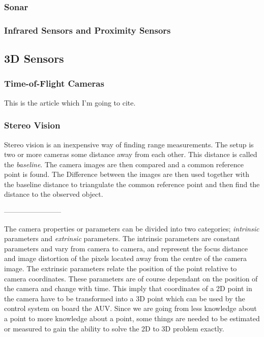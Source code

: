 \subsubsection{Sonar}


\subsubsection{Infrared Sensors and Proximity Sensors}


\subsection{3D Sensors}


\subsubsection{Time-of-Flight Cameras}
This is the article which I'm going to cite. \cite{sr3000}



\subsubsection{Stereo Vision}
Stereo vision is an inexpensive way of finding range measurements. The setup is two or
more cameras some distance away from each other. This distance is called the
\emph{baseline}. The camera images are then compared and a common reference point is
found. The Difference between the images are then used together with the baseline distance
to triangulate the common reference point and then find the distance to the observed
object. 


------------------------

	The camera properties or parameters can be divided into two categories; \textit{intrinsic} parameters and
	\textit{extrinsic} parameters. The intrinsic parameters are constant parameters and vary from camera to
	camera, and represent the focus distance and image distortion of the pixels located away from the centre of the
	camera image. 
	The extrinsic parameters relate the position of the point relative to camera coordinates. 
	These parameters are of course dependant on the position of the camera and change with time. 	This imply that 
	coordinates of a 2D point in the camera have to be transformed into a 3D point which can be used 
	by the control system on board the AUV. Since 
	we are going from less knowledge about a point to more knowledge about a point, some things are needed to be 
	estimated or measured to gain the ability to solve the 2D to 3D problem exactly.\cite{robotbok}

